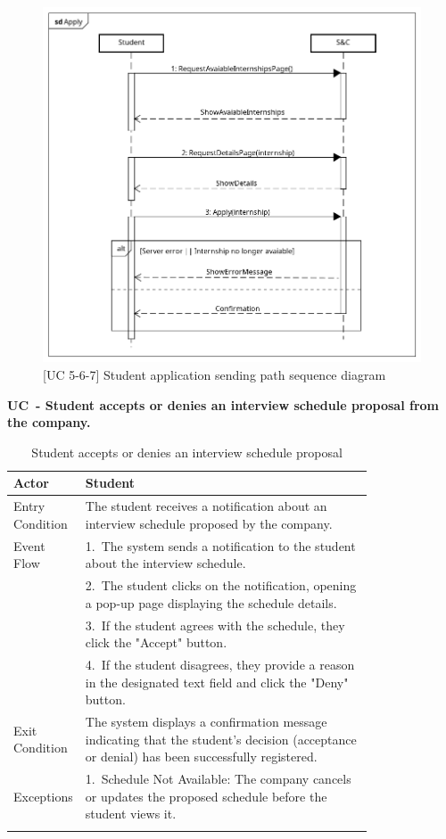 \begin{figure}[H]
    \centering
    \includegraphics[width=1\linewidth]{Images/Sequence diagrams/Application.png}
    \caption{[UC 5-6-7] Student application sending path sequence diagram}
    \label{fig:enter-label}
\end{figure}

\textbf{UC\cuc\  - Student accepts or denies an interview schedule proposal from the company.}

\begin{center} 
    \renewcommand{\arraystretch}{1.2} 
    \begin{longtable}{ l p{0.8\linewidth} } 
        \hline
        Actor & Student \\ \hline
        Entry Condition & The student receives a notification about an interview schedule proposed by the company. \\ \hline 
        Event Flow & 1.\ The system sends a notification to the student about the interview schedule. \\ 
        & 2.\ The student clicks on the notification, opening a pop-up page displaying the schedule details. \\
        & 3.\ If the student agrees with the schedule, they click the "Accept" button. \\ 
        & 4.\ If the student disagrees, they provide a reason in the designated text field and click the "Deny" button. \\ \hline 
        Exit Condition & The system displays a confirmation message indicating that the student's decision (acceptance or denial) has been successfully registered. \\ \hline 
        Exceptions & 1.\ Schedule Not Available: The company cancels or updates the proposed schedule before the student views it. \\ \hline 
        \caption{Student accepts or denies an interview schedule proposal} 
        \label{tab:student_schedule_uc} 
    \end{longtable} 
\end{center}

